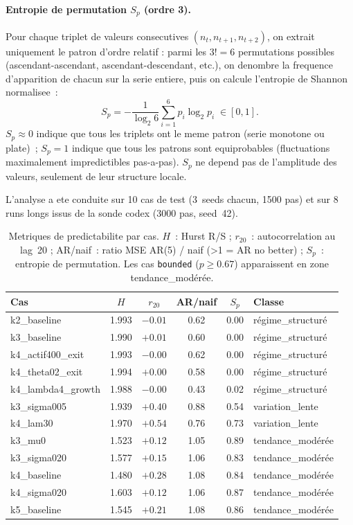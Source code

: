 \documentclass[11pt,a4paper]{article}
\begin{document}
\paragraph{Entropie de permutation $S_p$ (ordre 3).}
Pour chaque triplet de valeurs consecutives $(n_t, n_{t+1}, n_{t+2})$, on
extrait uniquement le patron d'ordre relatif : parmi les $3! = 6$ permutations
possibles (ascendant-ascendant, ascendant-descendant, etc.), on denombre la
frequence d'apparition de chacun sur la serie entiere, puis on calcule
l'entropie de Shannon normalisee~:
\[
  S_p = -\frac{1}{\log_2 6} \sum_{i=1}^{6} p_i \log_2 p_i \;\in [0, 1].
\]
$S_p \approx 0$ indique que tous les triplets ont le meme patron (serie
monotone ou plate)~; $S_p = 1$ indique que tous les patrons sont
equiprobables (fluctuations maximalement impredictibles pas-a-pas). $S_p$
ne depend pas de l'amplitude des valeurs, seulement de leur structure locale.

\bigskip
L'analyse a ete conduite sur 10 cas de test (3~seeds chacun,
1500 pas) et sur 8 runs longs issus de la sonde codex (3000 pas, seed~42).

\begin{table}[h]
\centering
\small
\begin{tabular}{lccccl}
\hline
Cas & $H$ & $r_{20}$ & AR/naif & $S_p$ & Classe \\
\hline
k2\_baseline         & 1.993 & $-0.01$ & 0.62 & 0.00 & régime\_structuré \\
k3\_baseline         & 1.990 & $+0.01$ & 0.60 & 0.00 & régime\_structuré \\
k4\_actif400\_exit   & 1.993 & $-0.00$ & 0.62 & 0.00 & régime\_structuré \\
k4\_theta02\_exit    & 1.994 & $+0.00$ & 0.58 & 0.00 & régime\_structuré \\
k4\_lambda4\_growth  & 1.988 & $-0.00$ & 0.43 & 0.02 & régime\_structuré \\
\hline
k3\_sigma005         & 1.939 & $+0.40$ & 0.88 & 0.54 & variation\_lente \\
k4\_lam30            & 1.970 & $+0.54$ & 0.76 & 0.73 & variation\_lente \\
\hline
k3\_mu0              & 1.523 & $+0.12$ & 1.05 & 0.89 & tendance\_modérée \\
k3\_sigma020         & 1.577 & $+0.15$ & 1.06 & 0.83 & tendance\_modérée \\
k4\_baseline         & 1.480 & $+0.28$ & 1.08 & 0.84 & tendance\_modérée \\
k4\_sigma020         & 1.603 & $+0.12$ & 1.06 & 0.87 & tendance\_modérée \\
k5\_baseline         & 1.545 & $+0.21$ & 1.08 & 0.86 & tendance\_modérée \\
\hline
\end{tabular}
\caption{Metriques de predictabilite par cas. $H$~: Hurst R/S ; $r_{20}$~: autocorrelation
au lag~20 ; AR/naif~: ratio MSE AR(5) / naif (>1 = AR no better) ; $S_p$~: entropie de
permutation. Les cas \texttt{bounded} (\(p \ge 0.67\)) apparaissent en zone tendance\_modérée.}
\end{table}
\end{document}
